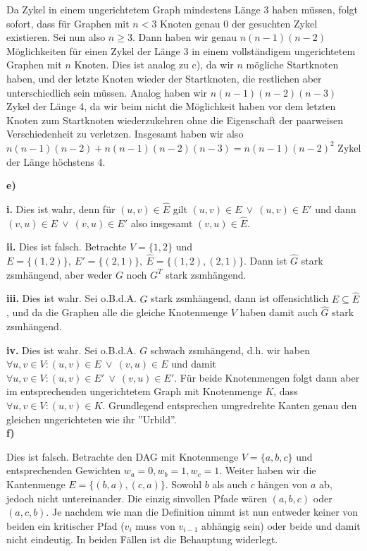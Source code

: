 \documentclass[a4paper,graphics,11pt]{article}
\begin{document}
Da Zykel in einem ungerichtetem Graph mindestens Länge 3 haben müssen, folgt sofort, dass für Graphen mit $n < 3$
Knoten genau 0 der gesuchten Zykel existieren. Sei nun also $n \geq 3$. Dann haben wir
genau $n(n-1)(n-2)$ Möglichkeiten für einen Zykel der Länge 3 in einem vollständigem ungerichtetem Graphen
mit $n$ Knoten. Dies ist analog zu c), da wir $n$ mögliche Startknoten haben, und der letzte Knoten wieder
der Startknoten, die restlichen aber unterschiedlich sein müssen. Analog haben wir $n(n-1)(n-2)(n-3)$
Zykel der Länge 4, da wir beim nicht die Möglichkeit haben vor dem letzten Knoten zum Startknoten wiederzukehren
ohne die Eigenschaft der paarweisen Verschiedenheit zu verletzen.
Insgesamt haben wir also\\ $n(n-1)(n-2)+n(n-1)(n-2)(n-3) = n(n-1)(n-2)^2$ Zykel der Länge höchstens 4.

\newpage

\textbf{e)}

\textbf{i.}
Dies ist wahr, denn für $(u,v) \in \hat{E}$ gilt $(u,v) \in E\ \lor\ (u,v) \in E'$ und dann\\
$(v,u) \in E\ \lor\ (v,u) \in E'$ also insgesamt $(v,u) \in \hat{E}$.

\textbf{ii.}
Dies ist falsch. Betrachte $V = \{1,2\}$ und $E = \{(1,2)\},\ E' = \{(2,1)\},\ \hat{E} = \{(1,2),(2,1)\}$.
Dann ist $\hat{G}$ stark zsmhängend, aber weder $G$ noch $G^T$ stark zsmhängend.

\textbf{iii.}
Dies ist wahr. Sei o.B.d.A. $G$ stark zsmhängend, dann ist offensichtlich $E \subseteq \hat{E}$, und da
die Graphen alle die gleiche Knotenmenge $V$ haben damit auch $\hat{G}$ stark zsmhängend.

\textbf{iv.}
Dies ist wahr. Sei o.B.d.A. $G$ schwach zsmhängend, d.h. wir haben\\
$\forall u,v \in V: (u,v) \in E\ \lor\ (v,u) \in E$ und damit $\forall u,v \in V: (u,v) \in E'\ \lor\ (v,u) \in E'$. Für beide Knotenmengen
folgt dann aber im entsprechenden ungerichtetem Graph mit Knotenmenge $K$, dass
$\forall u,v \in V: (u,v) \in K$. Grundlegend entsprechen umgredrehte Kanten genau den gleichen ungerichteten wie
ihr ''Urbild''.\\

\textbf{f)}

Dies ist falsch. Betrachte den DAG mit Knotenmenge $V = \{a,b,c\}$ und entsprechenden Gewichten $w_a = 0, w_b = 1,
w_c = 1$.
Weiter haben wir die Kantenmenge $E = \{(b,a),(c,a)\}$. Sowohl $b$ als auch $c$ hängen von $a$ ab, jedoch
nicht untereinander. Die einzig sinvollen Pfade wären $(a,b,c)$ oder $(a,c,b)$. Je nachdem
wie man die Definition nimmt ist nun entweder keiner von beiden ein kritischer Pfad ($v_i$ muss von $v_{i-1}$ abhängig
sein) oder beide und damit nicht eindeutig. In beiden Fällen ist die Behauptung widerlegt.
\end{document}
